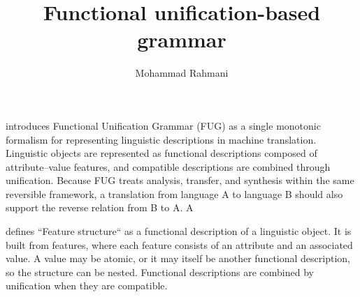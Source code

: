 \documentclass[a4paper]{article}
\title{Functional unification-based grammar}
\date{}
\author{Mohammad Rahmani}
\begin{document}
    \maketitle
    \cite{kay-1984-functional-unification-grammar} introduces Functional Unification Grammar (FUG) as a single monotonic formalism for representing linguistic descriptions in machine translation. Linguistic objects are represented as functional descriptions composed of attribute--value features, and compatible descriptions are combined through unification. Because FUG treats analysis, transfer, and synthesis within the same reversible framework, a translation from language A to language B should also support the reverse relation from B to A. A
    
    \cite{kay-1984-functional-unification-grammar} defines ``Feature structure`` as a functional description of a linguistic object. It is built from features, where each feature consists of an attribute and an associated value. A value may be atomic, or it may itself be another functional description, so the structure can be nested. Functional descriptions are combined by unification when they are compatible.
    
    
\end{document}
